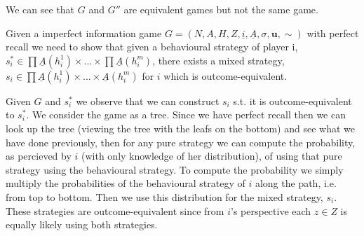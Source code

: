 \documentclass[12pt]{article}
\newenvironment{question}[2][Question]{\begin{trivlist}
\item[\hskip \labelsep {\bfseries #1}\hskip \labelsep {\bfseries #2.}]}{\end{trivlist}}
\newenvironment{answer}[2][Answer]{\begin{trivlist}
\item[\hskip \labelsep {\bfseries #1}\hskip \labelsep {\bfseries #2:}]}{\end{trivlist}}
\begin{document}
\begin{answer}{a)}
We can see that $G$ and $G''$ are equivalent games but not the same game.
\end{answer}

\begin{question}{3}
Given a imperfect information game  $G=(N, A, H, Z, \underline{i}, \underline{A}, \sigma, \boldsymbol{u}, \sim)$ with perfect recall we need to show that given a behavioural strategy of player i, $s_i^* \in \prod{}{}{\underline{A}(h_i^1)}\times ... \times \prod{}{}{\underline{A}(h_i^m)}$, there exists a mixed strategy, $s_i \in \prod{}{}{\underline{A}(h_i^1)\times ... \times \underline{A}(h_i^m)}$ for $i$ which is outcome-equivalent.
\end{question}
\begin{answer}{a)}

Given $G$ and $s_i^*$ we observe that we can construct $s_i$ s.t. it is outcome-equivalent to $s_i^*$. We consider the game as a tree. Since we have perfect recall then we can look up the tree (viewing the tree with the leafs on the bottom) and see what we have done previously, then for any pure strategy we can compute the probability, as percieved by $i$ (with only knowledge of her distribution), of using that pure strategy using the behavioural strategy. To compute the probability we simply multiply the probabilities of the behavioural strategy of $i$ along the path, i.e. from top to bottom. Then we use this distribution for the mixed strategy, $s_i$. These strategies are outcome-equivalent since from $i$'s perspective each $z \in Z$ is equally likely using both strategies.
\end{answer}
\end{document}
